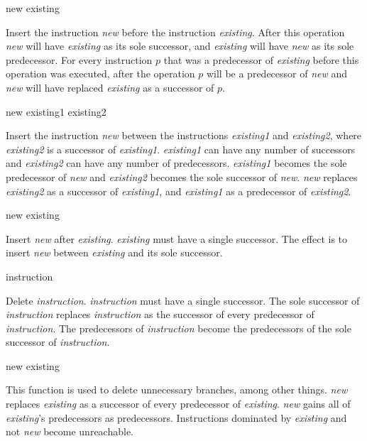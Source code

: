  {new existing}

Insert the instruction \textit{new} before the instruction
\textit{existing}.  After this operation \textit{new} will have
\textit{existing} as its sole successor, and \textit{existing} will
have \textit{new} as its sole predecessor.  For every instruction $p$
that was a predecessor of \textit{existing} before this operation was
executed, after the operation $p$ will be a predecessor of
\textit{new} and \textit{new} will have replaced \textit{existing} as
a successor of $p$.

 {new existing1 existing2}

Insert the instruction \textit{new} between the instructions
\textit{existing1} and \textit{existing2}, where \textit{existing2} is
a successor of \textit{existing1}.  \textit{existing1} can have any
number of successors and \textit{existing2} can have any number of
predecessors.  \textit{existing1} becomes the sole predecessor of
\textit{new} and \textit{existing2} becomes the sole successor of
\textit{new}.  \textit{new} replaces \textit{existing2} as a successor
of \textit{existing1}, and \textit{existing1} as a predecessor of
\textit{existing2}.

 {new existing}

Insert \textit{new} after \textit{existing}.  \textit{existing} must
have a single successor.  The effect is to insert \textit{new} between
\textit{existing} and its sole successor.

 {instruction}

Delete \textit{instruction}.  \textit{instruction} must have a single
successor.  The sole successor of \textit{instruction} replaces
\textit{instruction} as the successor of every predecessor of
\textit{instruction}.  The predecessors of \textit{instruction} become
the predecessors of the sole successor of \textit{instruction}.

 {new existing}

This function is used to delete unnecessary branches, among other things.
\textit{new} replaces \textit{existing} as a successor of every
predecessor of \textit{existing}. \textit{new} gains all of
\textit{existing}'s predecessors as predecessors.
Instructions dominated by \textit{existing} and not \textit{new} become
unreachable.

